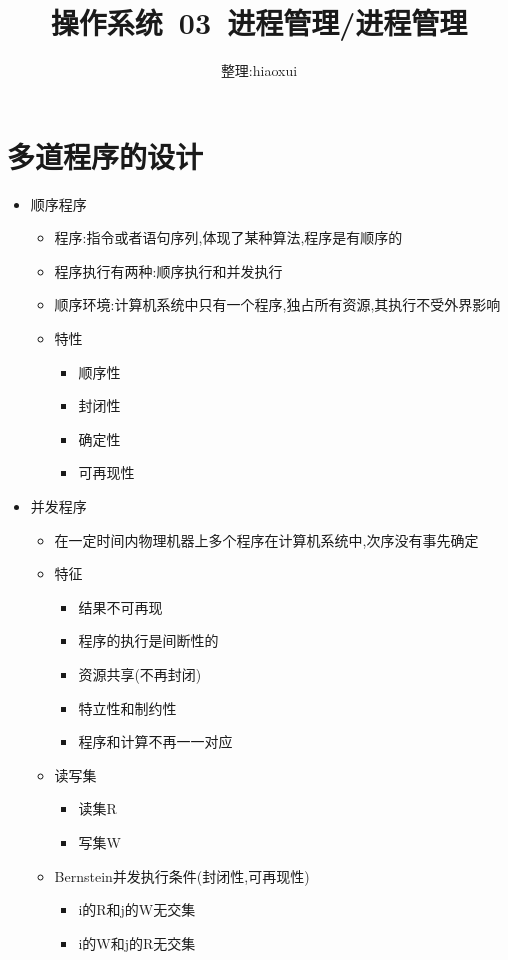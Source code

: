 \documentclass[a4paper,12pt,notitlepage]{article}
\begin{document}
\title{操作系统\ 03\ 进程管理/进程管理}
\author{整理:hiaoxui}
\maketitle

\section{多道程序的设计}
\begin{itemize}
	\item 顺序程序
	\begin{itemize}
		\item 程序:指令或者语句序列,体现了某种算法,程序是有顺序的
		\item 程序执行有两种:顺序执行和并发执行
		\item 顺序环境:计算机系统中只有一个程序,独占所有资源,其执行不受外界影响
		\item 特性
		\begin{itemize}
			\item 顺序性
			\item 封闭性
			\item 确定性
			\item 可再现性
		\end{itemize}
	\end{itemize}
	\item 并发程序
	\begin{itemize}
		\item 在一定时间内物理机器上多个程序在计算机系统中,次序没有事先确定
		\item 特征
		\begin{itemize}
			\item 结果不可再现
			\item 程序的执行是间断性的
			\item 资源共享(不再封闭)
			\item 特立性和制约性
			\item 程序和计算不再一一对应
		\end{itemize}
		\item 读写集
		\begin{itemize}
			\item 读集R
			\item 写集W
		\end{itemize}
		\item Bernstein并发执行条件(封闭性,可再现性)
		\begin{itemize}
			\item i的R和j的W无交集
			\item i的W和j的R无交集

\end{itemize}
\end{itemize}
\end{itemize}
\end{document}
